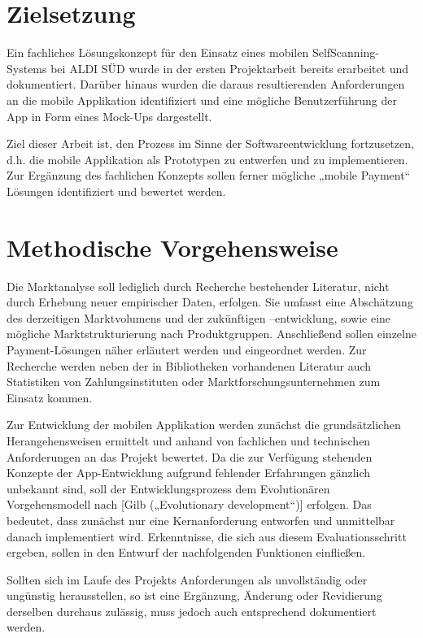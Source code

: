 \section{Zielsetzung}
Ein fachliches Lösungskonzept für den Einsatz eines mobilen SelfScanning-Systems bei ALDI SÜD wurde in der ersten Projektarbeit bereits erarbeitet und dokumentiert. Darüber hinaus wurden die daraus resultierenden Anforderungen an die mobile Applikation identifiziert und eine mögliche Benutzerführung der App in Form eines Mock-Ups dargestellt.

Ziel dieser Arbeit ist, den Prozess im Sinne der Softwareentwicklung fortzusetzen, d.h. die mobile Applikation als Prototypen zu entwerfen und zu implementieren. Zur Ergänzung des fachlichen Konzepts sollen ferner mögliche „mobile Payment“ Lösungen identifiziert und bewertet werden.

\section{Methodische Vorgehensweise}
Die Marktanalyse soll lediglich durch Recherche bestehender Literatur, nicht durch Erhebung neuer empirischer Daten, erfolgen. Sie umfasst eine Abschätzung des derzeitigen Marktvolumens und der zukünftigen –entwicklung, sowie eine mögliche Marktstrukturierung nach Produktgruppen. Anschließend sollen einzelne Payment-Lösungen näher erläutert werden und eingeordnet werden. Zur Recherche werden neben der in Bibliotheken vorhandenen Literatur auch Statistiken von Zahlungsinstituten oder Marktforschungsunternehmen zum Einsatz kommen.

Zur Entwicklung der mobilen Applikation werden zunächst die grundsätzlichen Herangehensweisen ermittelt und anhand von fachlichen und technischen Anforderungen an das Projekt bewertet. Da die zur Verfügung stehenden Konzepte der App-Entwicklung aufgrund fehlender Erfahrungen gänzlich unbekannt sind, soll der Entwicklungsprozess dem Evolutionären Vorgehensmodell nach [Gilb („Evolutionary development“)] erfolgen. Das bedeutet, dass zunächst nur eine Kernanforderung entworfen und unmittelbar danach implementiert wird. Erkenntnisse, die sich aus diesem Evaluationsschritt ergeben, sollen in den Entwurf der nachfolgenden Funktionen einfließen.

Sollten sich im Laufe des Projekts Anforderungen als unvollständig oder ungünstig herausstellen, so ist eine Ergänzung, Änderung oder Revidierung derselben durchaus zulässig, muss jedoch auch entsprechend dokumentiert werden.

